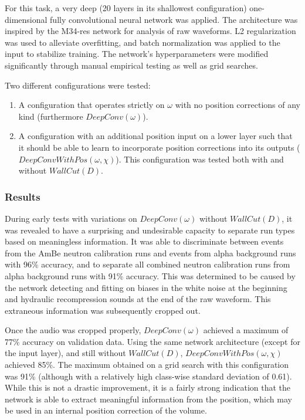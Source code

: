 \documentclass[10pt]{article}
\begin{document}
For this task, a very deep (20 layers in its shallowest configuration) one-dimensional fully convolutional neural network was applied. The architecture was inspired by the M34-res network \cite{verydeepconvnets} for analysis of raw waveforms. L2 regularization was used to alleviate overfitting, and batch normalization was applied to the input to stabilize training. The network's hyperparameters were modified significantly through manual empirical testing as well as grid searches.

Two different configurations were tested:
\begin{enumerate}
    \item A configuration that operates strictly on $\omega$ with no position corrections of any kind (furthermore $DeepConv(\omega)$).
    \item A configuration with an additional position input on a lower layer such that it should be able to learn to incorporate position corrections into its outputs ($DeepConvWithPos(\omega, \chi)$). This configuration was tested both with and without $WallCut(D)$.
\end{enumerate}

\subsubsection{Results}

During early tests with variations on $DeepConv(\omega)$ without $WallCut(D)$, it was revealed to have a surprising and undesirable capacity to separate run types based on meaningless information. It was able to discriminate between events from the AmBe neutron calibration runs and events from alpha background runs with 96\% accuracy, and to separate all combined neutron calibration runs from alpha background runs with 91\% accuracy. This was determined to be caused by the network detecting and fitting on biases in the white noise at the beginning and hydraulic recompression sounds at the end of the raw waveform. This extraneous information was subsequently cropped out.

Once the audio was cropped properly, $DeepConv(\omega)$ achieved a maximum of 77\% accuracy on validation data. Using the same network architecture (except for the input layer), and still without $WallCut(D)$, $DeepConvWithPos(\omega, \chi)$ achieved 85\%. The maximum obtained on a grid search with this configuration was 91\% (although with a relatively high class-wise standard deviation of 0.61). While this is not a drastic improvement, it is a fairly strong indication that the network is able to extract meaningful information from the position, which may be used in an internal position correction of the volume.
\end{document}
